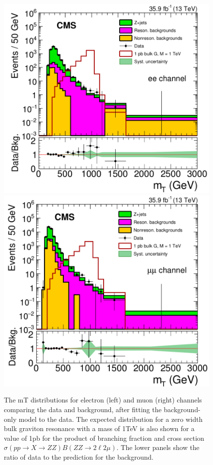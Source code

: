 \begin{figure}[htbp]
\begin{center}
\includegraphics[width=0.9\linewidth]{figures/sys_elSRuncMT.png}
\includegraphics[width=0.9\linewidth]{figures/sys_muSRuncMT.png}
\caption{The mT distributions for electron (left) and muon (right) channels comparing the data and background, after fitting the background-only model to the data. The expected distribution for a zero width bulk graviton resonance with a mass of 1TeV is also shown for a value of 1pb for the product of branching fraction and cross section $\sigma(pp\rightarrow X\rightarrow ZZ)B(ZZ\rightarrow 2\ell 2\mu)$. The lower panels show the ratio of data to the prediction for the background.}
\label{fig:sys_uncMT}
\end{center}
\end{figure}

